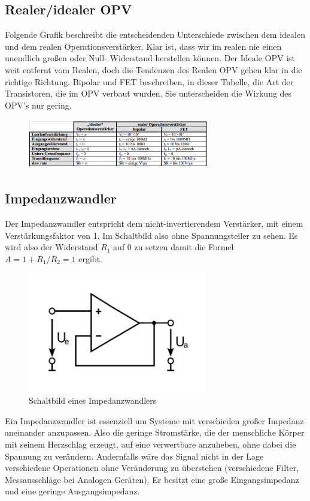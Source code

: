 \subsection{Realer/idealer OPV}

Folgende Grafik beschreibt die entscheidenden Unterschiede zwischen dem idealen und dem realen Operationsverstärker.
Klar ist, dass wir im realen nie einen unendlich großen oder Null- Widerstand herstellen können. Der Ideale OPV ist weit entfernt vom Realen, doch die Tendenzen des Realen OPV gehen klar in die richtige Richtung. Bipolar und FET beschreiben, in dieser Tabelle, die Art der Transistoren, die im OPV verbaut wurden. Sie unterscheiden die Wirkung des OPV’s nur gering.

\begin{figure}[H]
     \centering
     \includegraphics[width=\textwidth]{Abb/vergl.pdf}
\end{figure}

\subsection{Impedanzwandler}

Der Impedanzwandler entspricht dem nicht-invertierendem Verstärker, mit einem Verstärkungsfaktor von 1. Im Schaltbild also ohne Spannungsteiler zu sehen. Es wird also der Widerstand $R_1$ auf 0 zu setzen damit die Formel $A= 1+ R_1/R_2 = 1$ ergibt.
\begin{figure}[H]
     \centering
     \includegraphics[width=0.7\textwidth]{Abb/impconv.pdf}
     \caption{Schaltbild eines Impedanzwandlers}
\end{figure}
Ein Impedanzwandler ist essenziell um Systeme mit verschieden großer Impedanz aneinander anzupassen. Also die geringe Stromstärke, die der menschliche Körper mit seinem Herzschlag erzeugt, auf eine verwertbare anzuheben, ohne dabei die Spannung zu verändern. Andernfalls wäre das Signal nicht in der Lage verschiedene Operationen ohne Veränderung zu überstehen (verschiedene Filter, Messausschläge bei Analogen Geräten). Er besitzt eine große Eingangsimpedanz und eine geringe Ausgangsimpedanz. 

